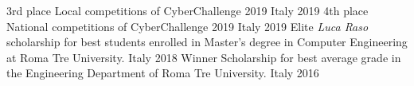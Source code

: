 


\begin{cvhonors}

  \cvhonor
    {3rd place} %
    {Local competitions of CyberChallenge 2019} %
    {Italy} %
    {2019} %
  \cvhonor
    {4th place} %
    {National competitions of CyberChallenge 2019} %
    {Italy} %
    {2019} %
  \cvhonor
    {Elite} %
    {\textit{Luca Raso} scholarship for best students enrolled in Master's degree in Computer Engineering at Roma Tre University.} %
    {Italy} %
    {2018} %
  \cvhonor
    {Winner} %
    {Scholarship for best average grade in the Engineering Department of Roma Tre University.} %
    {Italy} %
    {2016} %
  \end{cvhonors}